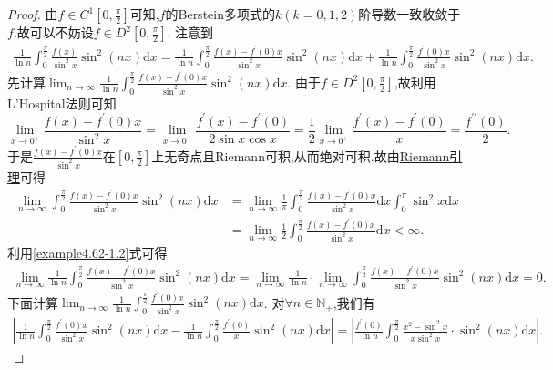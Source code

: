 \documentclass[../../main.tex]{subfiles}
\begin{document}
\begin{proof}
由$f\in C^1[0,\frac{\pi}{2}]$可知,$f$的Berstein多项式的$k(k=0,1,2)$阶导数一致收敛于$f$.故可以不妨设$f\in D^2[0,\frac{\pi}{2}]$.
注意到
\begin{align}\label{example4.62-1.1}
\frac{1}{\ln n}\int_0^{\frac{\pi}{2}}{\frac{f(x)}{\sin^2x}\sin^2(nx)\mathrm{d}x}=\frac{1}{\ln n}\int_0^{\frac{\pi}{2}}{\frac{f(x) - f^\prime(0)x}{\sin^2x}\sin^2(nx)\mathrm{d}x}+\frac{1}{\ln n}\int_0^{\frac{\pi}{2}}{\frac{f^\prime(0)x}{\sin^2x}\sin^2(nx)\mathrm{d}x}. 
\end{align}
先计算\(\lim_{n\rightarrow \infty} \frac{1}{\ln n}\int_0^{\frac{\pi}{2}}{\frac{f(x) - f^\prime(0)x}{\sin^2x}\sin^2(nx)\mathrm{d}x}\).
由于\(f\in D^2\left[0, \frac{\pi}{2}\right]\),故利用L'Hospital法则可知
\[
\lim_{x\rightarrow 0^+} \frac{f(x) - f^\prime(0)x}{\sin^2x}=\lim_{x\rightarrow 0^+} \frac{f^\prime(x) - f^\prime(0)}{2\sin x\cos x}=\frac{1}{2}\lim_{x\rightarrow 0^+} \frac{f^\prime(x) - f^\prime(0)}{x}=\frac{f^{\prime\prime}(0)}{2}.
\]
于是\(\frac{f(x) - f^\prime(0)x}{\sin^2x}\)在\(\left[0, \frac{\pi}{2}\right]\)上无奇点且Riemann可积,从而绝对可积.故由\hyperref[theorem:Riemann引理]{Riemann引理}可得
\begin{align}
\lim_{n\rightarrow \infty} \int_0^{\frac{\pi}{2}}{\frac{f(x) - f^\prime(0)x}{\sin^2x}\sin^2(nx)\mathrm{d}x}&=\lim_{n\rightarrow \infty} \frac{1}{\pi}\int_0^{\frac{\pi}{2}}{\frac{f(x) - f^\prime(0)x}{\sin^2x}\mathrm{d}x}\int_0^{\pi}{\sin^2x\mathrm{d}x}
\nonumber
\\
&=\lim_{n\rightarrow \infty} \frac{1}{2}\int_0^{\frac{\pi}{2}}{\frac{f(x) - f^\prime(0)x}{\sin^2x}\mathrm{d}x}<\infty. \label{example4.62-1.2}
\end{align}
利用\eqref{example4.62-1.2}式可得
\begin{align}\label{example4.62-1.3}
\lim_{n\rightarrow \infty} \frac{1}{\ln n}\int_0^{\frac{\pi}{2}}{\frac{f(x) - f^\prime(0)x}{\sin^2x}\sin^2(nx)\mathrm{d}x}=\lim_{n\rightarrow \infty} \frac{1}{\ln n}\cdot \lim_{n\rightarrow \infty} \int_0^{\frac{\pi}{2}}{\frac{f(x) - f^\prime(0)x}{\sin^2x}\sin^2(nx)\mathrm{d}x}=0.  
\end{align}
下面计算\(\lim_{n\rightarrow \infty} \frac{1}{\ln n}\int_0^{\frac{\pi}{2}}{\frac{f^\prime(0)x}{\sin^2x}\sin^2(nx)\mathrm{d}x}\).
对\(\forall n\in \mathbb{N}_+\),我们有
\begin{align}\label{example4.62-1.4}
\left|\frac{1}{\ln n}\int_0^{\frac{\pi}{2}}{\frac{f^\prime(0)x}{\sin^2x}\sin^2(nx)\mathrm{d}x}-\frac{1}{\ln n}\int_0^{\frac{\pi}{2}}{\frac{f^\prime(0)}{x}\sin^2(nx)\mathrm{d}x}\right|=\left|\frac{f^\prime(0)}{\ln n}\int_0^{\frac{\pi}{2}}{\frac{x^2 - \sin^2x}{x\sin^2x}\cdot \sin^2(nx)\mathrm{d}x}\right|.

\end{align}
\end{proof}
\end{document}
